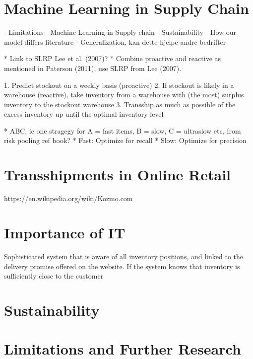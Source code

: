 \documentclass[../../main.tex]{subfiles}
\begin{document}

\section{Machine Learning in Supply Chain}


- Limitations
- Machine Learning in Supply chain
- Sustainability
- How our model differs literature
- Generalization, kan dette hjelpe andre bedrifter

* Link to SLRP Lee et al. (2007)?
  * Combine proactive and reactive as mentioned in Paterson (2011), use SLRP from Lee (2007).

1.	Predict stockout on a weekly basis (proactive)
2.	If stockout is likely in a warehouse (reactive), take inventory from a warehouse with (the most) surplus inventory to the stockout warehouse
3.	Transship as much as possible of the excess inventory up until the optimal inventory level

*	ABC, ie one stragegy for A = fast items, B = slow, C = ultraslow etc, from risk pooling ref book? 
  * Fast: Optimize for recall
  * Slow: Optimize for precision

\section{Transshipments in Online Retail}
https://en.wikipedia.org/wiki/Kozmo.com

\section{Importance of IT}
Sophisticated system that is aware of all inventory positions, and linked to the delivery promise offered on the website. If the system knows that inventory is sufficiently close to the customer

\section{Sustainability}

\section{Limitations and Further Research}

\end{document}
